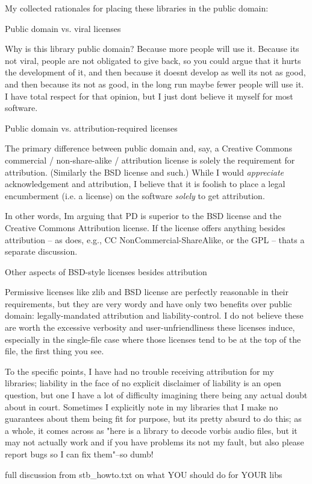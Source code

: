 My collected rationales for placing these libraries in the public domain\+:


\begin{DoxyEnumerate}
\item Public domain vs. viral licenses

Why is this library public domain? Because more people will use it. Because it\textquotesingle{}s not viral, people are not obligated to give back, so you could argue that it hurts the development of it, and then because it doesn\textquotesingle{}t develop as well it\textquotesingle{}s not as good, and then because it\textquotesingle{}s not as good, in the long run maybe fewer people will use it. I have total respect for that opinion, but I just don\textquotesingle{}t believe it myself for most software.
\item Public domain vs. attribution-\/required licenses

The primary difference between public domain and, say, a Creative Commons commercial / non-\/share-\/alike / attribution license is solely the requirement for attribution. (Similarly the B\+SD license and such.) While I would {\itshape appreciate} acknowledgement and attribution, I believe that it is foolish to place a legal encumberment (i.\+e. a license) on the software {\itshape solely} to get attribution.

In other words, I\textquotesingle{}m arguing that PD is superior to the B\+SD license and the Creative Commons \textquotesingle{}Attribution\textquotesingle{} license. If the license offers anything besides attribution -- as does, e.\+g., CC Non\+Commercial-\/\+Share\+Alike, or the G\+PL -- that\textquotesingle{}s a separate discussion.
\item Other aspects of B\+S\+D-\/style licenses besides attribution

Permissive licenses like zlib and B\+SD license are perfectly reasonable in their requirements, but they are very wordy and have only two benefits over public domain\+: legally-\/mandated attribution and liability-\/control. I do not believe these are worth the excessive verbosity and user-\/unfriendliness these licenses induce, especially in the single-\/file case where those licenses tend to be at the top of the file, the first thing you see.

To the specific points, I have had no trouble receiving attribution for my libraries; liability in the face of no explicit disclaimer of liability is an open question, but one I have a lot of difficulty imagining there being any actual doubt about in court. Sometimes I explicitly note in my libraries that I make no guarantees about them being fit for purpose, but it\textquotesingle{}s pretty absurd to do this; as a whole, it comes across as "here is a library to decode vorbis audio files, but it may not actually work and if you have problems it\textquotesingle{}s not my fault, but also please report bugs so I can fix them"--so dumb!
\item full discussion from stb\+\_\+howto.\+txt on what Y\+OU should do for Y\+O\+UR libs
\end{DoxyEnumerate}


